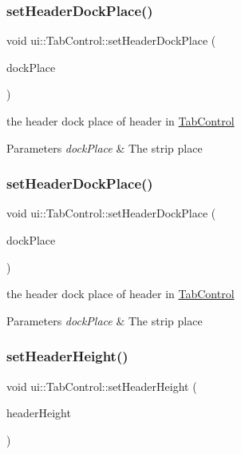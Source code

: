 \subsubsection{\texorpdfstring{set\+Header\+Dock\+Place()}{setHeaderDockPlace()}\hspace{0.1cm}{\footnotesize\ttfamily [1/2]}}
{\footnotesize\ttfamily void ui\+::\+Tab\+Control\+::set\+Header\+Dock\+Place (\begin{DoxyParamCaption}\item[{Tab\+Control\+::\+Dock}]{dock\+Place }\end{DoxyParamCaption})}

the header dock place of header in \hyperlink{classui_1_1TabControl}{Tab\+Control} 
\begin{DoxyParams}{Parameters}
{\em dock\+Place} & The strip place \\
\hline
\end{DoxyParams}
\mbox{\label{classui_1_1TabControl_afd8f0b327792d7a5a91359c135459b4c}} 
\subsubsection{\texorpdfstring{set\+Header\+Dock\+Place()}{setHeaderDockPlace()}\hspace{0.1cm}{\footnotesize\ttfamily [2/2]}}
{\footnotesize\ttfamily void ui\+::\+Tab\+Control\+::set\+Header\+Dock\+Place (\begin{DoxyParamCaption}\item[{Tab\+Control\+::\+Dock}]{dock\+Place }\end{DoxyParamCaption})}

the header dock place of header in \hyperlink{classui_1_1TabControl}{Tab\+Control} 
\begin{DoxyParams}{Parameters}
{\em dock\+Place} & The strip place \\
\hline
\end{DoxyParams}
\mbox{\label{classui_1_1TabControl_af24eae9f0c9d5613ccc4d28a37dc0f3a}} 
\subsubsection{\texorpdfstring{set\+Header\+Height()}{setHeaderHeight()}\hspace{0.1cm}{\footnotesize\ttfamily [1/2]}}
{\footnotesize\ttfamily void ui\+::\+Tab\+Control\+::set\+Header\+Height (\begin{DoxyParamCaption}\item[{float}]{header\+Height }\end{DoxyParamCaption})}

